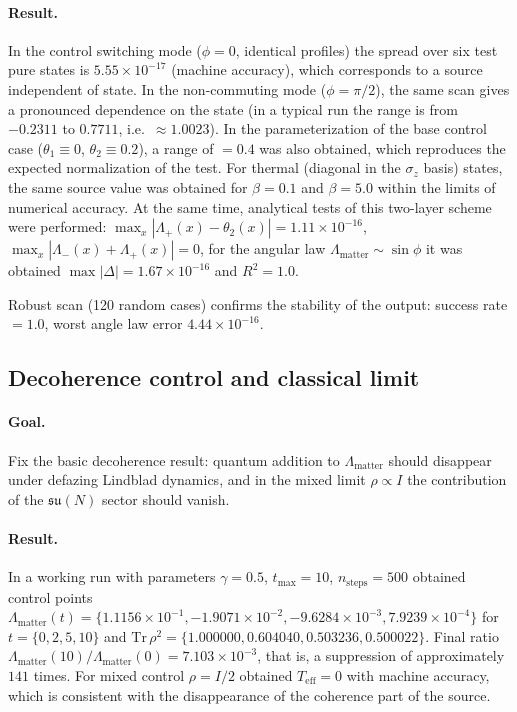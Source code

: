 \documentclass[11pt,a4paper]{article}
\theoremstyle{definition}
\theoremstyle{plain}
\theoremstyle{remark}
\begin{document}
\paragraph{Result.}
In the control switching mode ($\phi=0$, identical profiles) the spread over six test pure states
is $5.55\times 10^{-17}$ (machine accuracy), which corresponds to a source independent of state.
In the non-commuting mode ($\phi=\pi/2$), the same scan gives a pronounced dependence on the state
(in a typical run the range is from $-0.2311$ to $0.7711$, i.e.\ $\approx 1.0023$).
In the parameterization of the base control case
($\theta_1\equiv 0$, $\theta_2\equiv 0.2$), a range of $=0.4$ was also obtained,
which reproduces the expected normalization of the test.
For thermal (diagonal in the $\sigma_z$ basis) states, the same source value was obtained
for $\beta=0.1$ and $\beta=5.0$ within the limits of numerical accuracy.
At the same time, analytical tests of this two-layer scheme were performed:
$\max_x|\Lambda_{+}(x)-\theta_2(x)|=1.11\times 10^{-16}$,
$\max_x|\Lambda_{-}(x)+\Lambda_{+}(x)|=0$,
for the angular law $\Lambda_{\mathrm{matter}}\sim\sin\phi$ it was obtained
$\max|\Delta|=1.67\times 10^{-16}$ and $R^2=1.0$.

Robust scan (120 random cases) confirms the stability of the output:
success rate $=1.0$, worst angle law error $4.44\times 10^{-16}$.

\subsection{Decoherence control and classical limit}
\label{sec:numerics:wave1decoherence}

\paragraph{Goal.}
Fix the basic decoherence result: quantum addition to $\Lambda_{\mathrm{matter}}$
should disappear under defazing Lindblad dynamics, and in the mixed limit $\rho\propto I$ the contribution of the
$\mathfrak{su}(N)$ sector should vanish.

\paragraph{Result.}
In a working run with parameters $\gamma=0.5$, $t_{\max}=10$, $n_{\text{steps}}=500$
obtained control points
$\Lambda_{\mathrm{matter}}(t)=\{1.1156\times10^{-1},-1.9071\times10^{-2},-9.6284\times10^{-3},7.9239\times10^{-4}\}$
for $t=\{0,2,5,10\}$ and
$\mathrm{Tr}\,\rho^2=\{1.000000,0.604040,0.503236,0.500022\}$.
Final ratio
$\Lambda_{\mathrm{matter}}(10)/\Lambda_{\mathrm{matter}}(0)=7.103\times10^{-3}$,
that is, a suppression of approximately $141$ times.
For mixed control $\rho=I/2$ obtained $T_{\mathrm{eff}}=0$ with machine accuracy,
which is consistent with the disappearance of the coherence part of the source.
\end{document}
